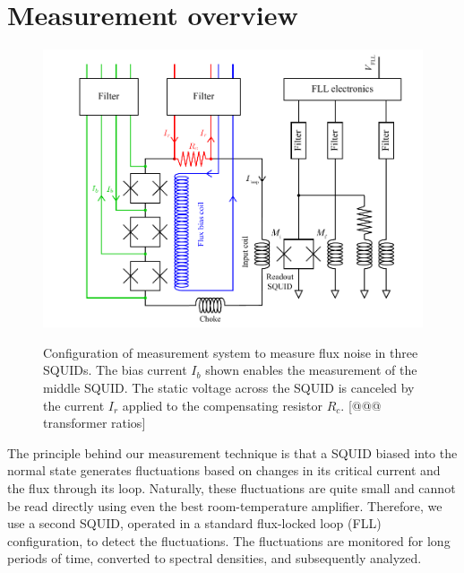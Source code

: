 \section{Measurement overview}

\begin{figure}
\centering\includegraphics{experimental/Fig_schematic}\\
\caption[Schematic of measurement system]{Configuration of measurement system to measure flux noise in three SQUIDs. The bias current $I_b$ shown enables the measurement of the middle SQUID. The static voltage across the SQUID is canceled by the current $I_r$ applied to the compensating resistor $R_c$. [@@@ transformer ratios]}
\label{fig:experimental:schematic}
\end{figure}

The principle behind our measurement technique is that a SQUID biased into the normal state generates fluctuations based on changes in its critical current and the flux through its loop. Naturally, these fluctuations are quite small and cannot be read directly using even the best room-temperature amplifier. Therefore, we use a second SQUID, operated in a standard flux-locked loop (FLL) configuration, to detect the fluctuations. The fluctuations are monitored for long periods of time, converted to spectral densities, and subsequently analyzed.

